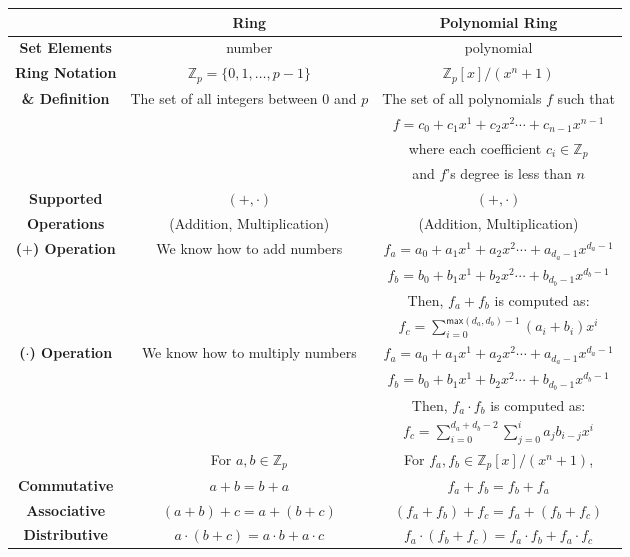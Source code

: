 \begin{table}[h]
\centering
\footnotesize
\begin{tabular}{|c||c|c|} %
\hline
&\textbf{Ring} & \textbf {Polynomial Ring} \\
\hline
\hline
\textbf{{Set Elements}} & number & polynomial \\
\hline
\textbf{{Ring Notation}} & $\mathbb{Z}_p = \{0, 1, \ldots, p - 1\}$  & $\mathbb{Z}_p[x] / (x^n + 1)$ \\
\textbf{{\& Definition}} & The set of all integers between $0$ and $p$ & The set of all polynomials $f$ such that\\
&& $f= c_0 + c_1x^1 + c_2x^2 \cdots + c_{n-1}x^{n-1}$ \\
&& where each coefficient $c_i \in \mathbb{Z}_p$ \\
&& and $f$'s degree is less than $n$ \\
\hline
\textbf{{Supported}}&$(+, \cdot)$& $(+, \cdot)$ \\
\textbf{{Operations}}&(Addition, Multiplication)& (Addition, Multiplication) \\
\hline
\textbf{{($+$) Operation}} & We know how to add numbers & $f_a = a_0 + a_1x^1 + a_2x^2 \cdots + a_{d_a-1}x^{d_a-1}$ \\
 & & $f_b = b_0 + b_1x^1 + b_2x^2 \cdots + b_{d_b-1}x^{d_b-1}$ \\
 & & Then, $f_a + f_b$ is computed as: \\
 & & $f_c = \sum\limits_{i=0}^{\textsf{max}(d_a,d_b)-1}(a_i+b_i)x^i$ \\
\hline
\textbf{{($\cdot$) Operation}} & We know how to multiply numbers & $f_a = a_0 + a_1x^1 + a_2x^2 \cdots + a_{d_a-1}x^{d_a-1}$ \\
 & & $f_b = b_0 + b_1x^1 + b_2x^2 \cdots + b_{d_b-1}x^{d_b-1}$ \\
 & & Then, $f_a \cdot f_b$ is computed as: \\
 & & $f_c = \sum\limits_{i=0}^{d_a+d_b-2}\sum\limits_{j=0}^{i}a_jb_{i-j}x^i$ \\
\hline
& For $a, b \in \mathbb{Z}_p$ & For $f_a, f_b \in \mathbb{Z}_p[x]/(x^n + 1)$,\\
\textbf{{Commutative}}  & $ a + b = b + a$ & $f_a + f_b = f_b + f_a$\\
\textbf{{Associative}} & $(a + b) + c = a + (b + c)$ & $(f_a + f_b) + f_c = f_a + (f_b + f_c)$\\
\textbf{{Distributive}} & $a \cdot (b + c) = a\cdot b + a\cdot c$ & $f_a \cdot (f_b + f_c) = f_a\cdot f_b + f_a\cdot f_c$\\

\end{tabular}
\end{table}

